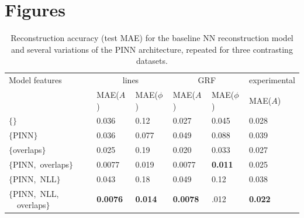 \documentclass[sn-mathphys]{sn-jnl}%
\theoremstyle{thmstyleone}%
\theoremstyle{thmstyletwo}%
\theoremstyle{thmstylethree}%
\begin{document}
\section{Figures}\label{sec6}






\begin{table}[h]
\begin{center}
\caption{Reconstruction accuracy (test MAE) for the baseline NN reconstruction model and several variations of the PINN architecture, repeated for three contrasting datasets. }\label{tab2}%
\begin{tabular}{p{2cm}llllll}
\toprule 
    Model features & \multicolumn{2}{c}{lines} & \multicolumn{2}{c}{GRF} & \multicolumn{2}{c}{experimental}\\
    & MAE($A$) & MAE($\phi$)
    & MAE($A$) & MAE($\phi$)
    & MAE($A$) \\%
    \midrule
$\{\}$ \footnotemark[1]    & 0.036   & 0.12  & 0.027 & 0.045 & 0.028 \\
$\{\mathrm{PINN}  \}$  & 0.036   & 0.077 & 0.049 & 0.088 & 0.039 \\
$\{$overlaps$\}$  & 0.025 & 0.19 &  0.020 & 0.033 & 0.027 \\
$\{$PINN,~overlaps$\}$   & 0.0077 & 0.019 & 0.0077 & \bf{0.011} & 0.025 \\
  $\{$PINN,~NLL$\}$     & 0.043    &   0.18  & 0.049 & 0.12 &  0.038 \\
  $\{$PINN,~NLL,\newline
 ~~overlaps$\}$     & \bf{0.0076}    &   \bf{0.014}  & \bf{0.0078} & .012 &  \bf{0.022}  \\
    \bottomrule
\end{tabular}
\end{center}
\end{table}
\end{document}
